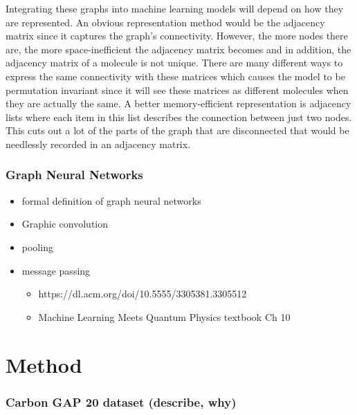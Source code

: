 \documentclass[12pt]{scrartcl}
\begin{document}
Integrating these graphs into machine learning models will depend on how they are represented. 
An obvious representation method would be the adjacency matrix since it captures the graph's connectivity. 
However, the more nodes there are, the more space-inefficient the adjacency matrix becomes and in addition,
the adjacency matrix of a molecule is not unique. There are many different ways to express the same 
connectivity with these matrices which causes the model to be permutation invariant since it will see 
these matrices as different molecules when they are actually the same. A better memory-efficient representation 
is adjacency lists where each item in this list describes the connection between just two nodes. This cuts out 
a lot of the parts of the graph that are disconnected that would be needlessly recorded in an adjacency matrix.

\subsubsection{Graph Neural Networks}    
\begin{itemize}
    \item formal definition of graph neural networks
    \item Graphic convolution
    \item pooling
    \item message passing
    \begin{itemize}
        \item https://dl.acm.org/doi/10.5555/3305381.3305512
        \item Machine Learning Meets Quantum Physics textbook Ch 10
    \end{itemize}
\end{itemize}

  




\newpage 

\section{Method}
\subsubsection{Carbon GAP 20 dataset (describe, why)}  
\end{document}
